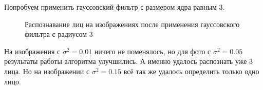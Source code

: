Попробуем применить гауссовский фильтр с размером ядра равным 3.
\begin{figure}[H]
	\begin{minipage}[H]{0.32\linewidth}
	\end{minipage}
	\begin{minipage}[H]{0.32\linewidth}
	\end{minipage}
	\begin{minipage}[H]{0.32\linewidth}
	\end{minipage}
	\caption{Распознавание лиц на изображениях после применения гауссовского фильтра с радиусом 3}
\end{figure}
На изображения с $\sigma^2=0.01$ ничего не поменялось, но для фото с $\sigma^2=0.05$ результаты работы алгоритма улучшились. А именно удалось распознать уже 3 лица. Но на изображении с $\sigma^2=0.15$ всё так же удалось определить только одно лицо.

